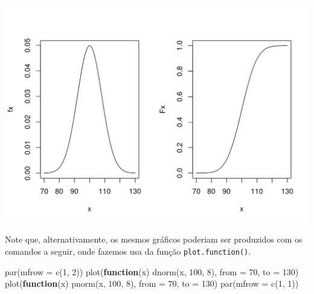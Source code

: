 \documentclass[
  10pt,
  a4paper]{book}
\newenvironment{Shaded}{\begin{snugshade}}{\end{snugshade}}
\newcommand{\AttributeTok}[1]{\textcolor[rgb]{0.77,0.63,0.00}{#1}}
\newcommand{\ControlFlowTok}[1]{\textcolor[rgb]{0.13,0.29,0.53}{\textbf{#1}}}
\newcommand{\DecValTok}[1]{\textcolor[rgb]{0.00,0.00,0.81}{#1}}
\newcommand{\FunctionTok}[1]{\textcolor[rgb]{0.00,0.00,0.00}{#1}}
\newcommand{\NormalTok}[1]{#1}
\begin{document}
\begin{center}\includegraphics{figures/unnamed-chunk-345-1} \end{center}

Note que, alternativamente, os mesmos gráficos poderiam ser produzidos
com os comandos a seguir, onde fazemos usa da função \texttt{plot.function()}.

\begin{Shaded}
\begin{Highlighting}[]
\FunctionTok{par}\NormalTok{(}\AttributeTok{mfrow =} \FunctionTok{c}\NormalTok{(}\DecValTok{1}\NormalTok{, }\DecValTok{2}\NormalTok{))}
\FunctionTok{plot}\NormalTok{(}\ControlFlowTok{function}\NormalTok{(x) }\FunctionTok{dnorm}\NormalTok{(x, }\DecValTok{100}\NormalTok{, }\DecValTok{8}\NormalTok{), }\AttributeTok{from =} \DecValTok{70}\NormalTok{, }\AttributeTok{to =} \DecValTok{130}\NormalTok{)}
\FunctionTok{plot}\NormalTok{(}\ControlFlowTok{function}\NormalTok{(x) }\FunctionTok{pnorm}\NormalTok{(x, }\DecValTok{100}\NormalTok{, }\DecValTok{8}\NormalTok{), }\AttributeTok{from =} \DecValTok{70}\NormalTok{, }\AttributeTok{to =} \DecValTok{130}\NormalTok{)}
\FunctionTok{par}\NormalTok{(}\AttributeTok{mfrow =} \FunctionTok{c}\NormalTok{(}\DecValTok{1}\NormalTok{, }\DecValTok{1}\NormalTok{))}
\end{Highlighting}
\end{Shaded}
\end{document}
